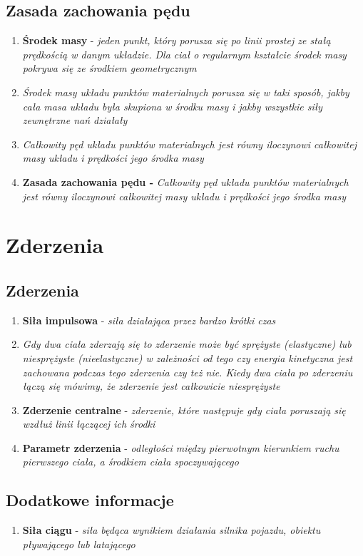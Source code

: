 \documentclass[12pt,twoside,a4paper]{book}
\begin{document}
\section{Zasada zachowania pędu}
\begin{enumerate}[label=(\alph*)]
\item\textbf{Środek masy} - \textit{jeden punkt, który porusza się po linii prostej ze stałą prędkością w danym układzie. Dla ciał o regularnym kształcie środek masy pokrywa się ze środkiem geometrycznym}
\item\textit{Środek masy układu punktów materialnych porusza się w taki sposób, jakby cała
masa układu była skupiona w środku masy i jakby wszystkie siły zewnętrzne nań działały}
\item\textit{Całkowity pęd układu punktów materialnych jest równy iloczynowi całkowitej masy
układu i prędkości jego środka masy}
\item\textbf{Zasada zachowania pędu - }\textit{Całkowity pęd układu punktów materialnych jest równy iloczynowi całkowitej masy układu i prędkości jego środka masy}
\end{enumerate}


\chapter{Zderzenia}
\section{Zderzenia}
\begin{enumerate}[label=(\alph*)]
\item\textbf{Siła impulsowa} - \textit{siła działająca przez bardzo krótki czas}
\item\textit{Gdy dwa ciała zderzają się to zderzenie może być sprężyste (elastyczne) lub
niesprężyste (nieelastyczne) w zależności od tego czy energia kinetyczna jest
zachowana podczas tego zderzenia czy też nie. Kiedy dwa ciała po zderzeniu łączą się mówimy, że zderzenie jest całkowicie niesprężyste}
\item\textbf{Zderzenie centralne} - \textit{zderzenie, które następuje gdy ciała poruszają się wzdłuż linii łączącej ich środki}
\item\textbf{Parametr zderzenia} - \textit{odległości między pierwotnym kierunkiem ruchu pierwszego ciała, a środkiem ciała spoczywającego}
\end{enumerate}
\section{Dodatkowe informacje}
\begin{enumerate}[label=(\alph*)]
\item\textbf{Siła ciągu} - \textit{siła będąca wynikiem działania silnika pojazdu, obiektu pływającego lub latającego}
\end{enumerate}
\end{document}
